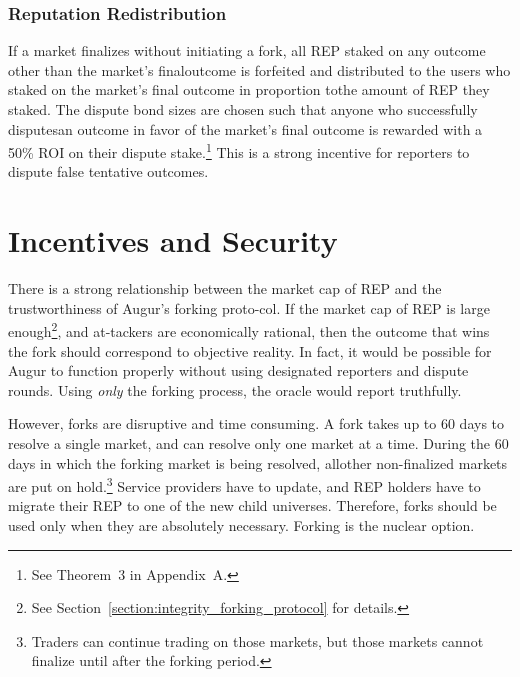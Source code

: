 \documentclass[12pt,floatfix,reprint,nofootinbib,amsmath,amssymb,epsfig,pre,floats,letterpaper,groupedaffiliation]{revtex4-1}
\theoremstyle{definition}
\theoremstyle{definition}
\begin{document}
\subsubsection{Reputation Redistribution}\label{section:rep_redistribution}

If a market finalizes without initiating a fork, all REP staked on any outcome other than the market's final\linebreak outcome is forfeited and distributed to the users who staked on the market's final outcome in proportion to\linebreak the amount of REP they staked. The dispute bond sizes are chosen such that anyone who successfully disputes\linebreak an outcome in favor of the market's final outcome is rewarded with a 50\% ROI on their dispute stake.\footnote{See Theorem~3 in Appendix~A.} This is a strong incentive for reporters to dispute false tentative outcomes.

\section{Incentives and Security}\label{section:incentives_and_security}

There is a strong relationship between the market cap of REP and the trustworthiness of Augur's forking proto-\linebreak col. If the market cap of REP is large enough\footnote{See Section~\ref{section:integrity_forking_protocol} for details.}, and at-\linebreak tackers are economically rational, then the outcome that wins the fork should correspond to objective reality. In fact, it would be possible for Augur to function properly without using designated reporters and dispute rounds. Using \textit{only} the forking process, the oracle would report truthfully.

However, forks are disruptive and time consuming. A fork takes up to 60 days to resolve a single market, and can resolve only one market at a time. During the 60 days in which the forking market is being resolved, all\linebreak other non-finalized markets are put on hold.\footnote{Traders can continue trading on those markets, but those markets cannot finalize until after the forking period.} Service providers have to update, and REP holders have to migrate their REP to one of the new child universes. Therefore, forks should be used only when they are absolutely necessary. Forking is the nuclear option.
\end{document}

